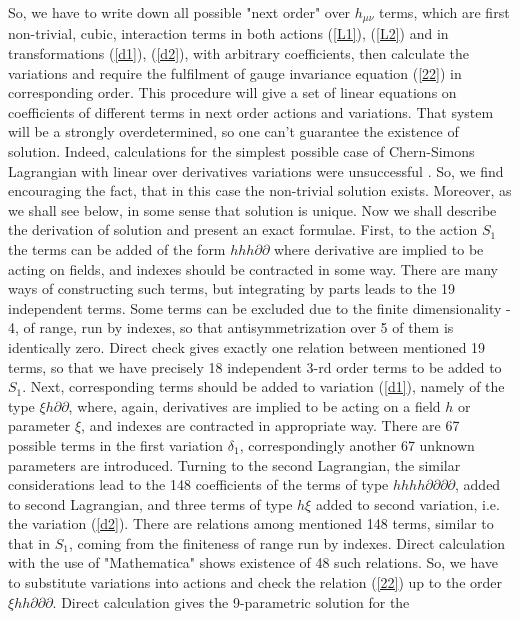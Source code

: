\documentclass[a4paper,12pt]{article}
\begin{document}
So, we have to write down all possible "next order" over
$h_{\mu\nu}$ terms, which are first non-trivial, cubic,
interaction terms in both actions (\ref{L1}), (\ref{L2}) and in
transformations (\ref{d1}), (\ref{d2}), with arbitrary
coefficients, then calculate the variations and require the
fulfilment of gauge invariance equation (\ref{22}) in
corresponding order. This procedure will give a set of linear
equations on coefficients of different terms in next order actions
and variations. That system will be a strongly overdetermined, so
one can't guarantee the existence of solution. Indeed,
calculations for the simplest possible case of Chern-Simons
Lagrangian with linear over derivatives variations were
unsuccessful \cite{Mkr}. So, we find encouraging the fact, that in
this case the non-trivial solution exists. Moreover, as we shall
see below, in some sense that solution is unique.
    Now we shall describe the derivation of solution and present an
exact formulae.
    First, to the action $S_{1}$ the terms can be added of the
form $hhh\partial\partial$ where derivative are implied to be
acting on fields, and indexes should be contracted in some way.
There are many ways of constructing such terms, but integrating by
parts leads to the 19 independent terms. Some terms can be
excluded due to the finite dimensionality - 4, of range, run by
indexes, so that antisymmetrization over 5 of them is identically
zero. Direct check gives exactly one relation between mentioned 19
terms, so that we have precisely 18 independent 3-rd order terms
to be added to $S_{1}$. Next, corresponding terms should be added
to variation (\ref{d1}), namely of the type $\xi h
\partial\partial$, where, again, derivatives are implied to be
acting on a field $h $ or parameter $\xi$, and indexes are
contracted in appropriate way. There are 67 possible terms in the
first variation $\delta_{1}$, correspondingly another 67 unknown
parameters are introduced. Turning to the second Lagrangian, the
similar considerations lead to the 148 coefficients of the terms
of type $hhhh\partial\partial\partial\partial$, added to second
Lagrangian, and three terms of type $h\xi$ added to second
variation, i.e. the variation (\ref{d2}). There are relations
among mentioned 148 terms, similar to that in $S_{1}$, coming from
the finiteness of range run by indexes. Direct calculation with
the use of "Mathematica" shows existence of 48 such relations.
    So, we have to substitute variations into actions and check
the relation (\ref{22}) up to the order $\xi hh
\partial\partial\partial$. Direct calculation  gives the 9-parametric solution for the
\end{document}
